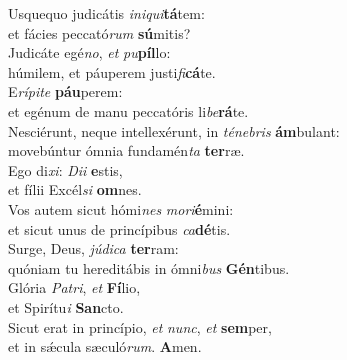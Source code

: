 \evenverse Usquequo judicátis \textit{i}\textit{ni}\textit{qui}\textbf{tá}tem:~\*\\
\evenverse et fácies peccató\textit{rum} \textbf{sú}mitis?\\
\oddverse Judicáte egé\textit{no}, \textit{et} \textit{pu}\textbf{píl}lo:~\*\\
\oddverse húmilem, et páuperem justi\textit{fi}\textbf{cá}te.\\
\evenverse E\textit{rí}\textit{pi}\textit{te} \textbf{páu}perem:~\*\\
\evenverse et egénum de manu peccatóris li\textit{be}\textbf{rá}te.\\
\oddverse Nesciérunt, neque intellexérunt, in \textit{té}\textit{ne}\textit{bris} \textbf{ám}bulant:~\*\\
\oddverse movebúntur ómnia fundamén\textit{ta} \textbf{ter}ræ.\\
\evenverse Ego di\textit{xi}: \textit{Di}\textit{i} \textbf{e}stis,~\*\\
\evenverse et fílii Excél\textit{si} \textbf{om}nes.\\
\oddverse Vos autem sicut hómi\textit{nes} \textit{mo}\textit{ri}\textbf{é}mini:~\*\\
\oddverse et sicut unus de princípibus \textit{ca}\textbf{dé}tis.\\
\evenverse Surge, Deus, \textit{jú}\textit{di}\textit{ca} \textbf{ter}ram:~\*\\
\evenverse quóniam tu hereditábis in ómni\textit{bus} \textbf{Gén}tibus.\\
\oddverse Glória \textit{Pa}\textit{tri}, \textit{et} \textbf{Fí}lio,~\*\\
\oddverse et Spirítu\textit{i} \textbf{San}cto.\\
\evenverse Sicut erat in princípio, \textit{et} \textit{nunc}, \textit{et} \textbf{sem}per,~\*\\
\evenverse et in sǽcula sæculó\textit{rum}. \textbf{A}men.\\
